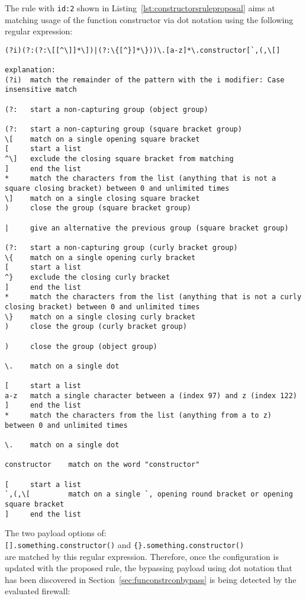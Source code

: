 The rule with \verb|id:2| shown in Listing~\ref{lst:constructorsruleproposal} aims at matching usage of the function constructor via dot notation using the following regular expression:

\begin{lstlisting}[style=basicStyle, caption=regex of proposed rule id:2, label={lst:constructorsruleproposalregexA}]
(?i)(?:(?:\[[^\]]*\])|(?:\{[^}]*\}))\.[a-z]*\.constructor[`,(,\[]

explanation:
(?i)  match the remainder of the pattern with the i modifier: Case insensitive match

(?:   start a non-capturing group (object group)

(?:   start a non-capturing group (square bracket group)
\[    match on a single opening square bracket
[     start a list
^\]   exclude the closing square bracket from matching
]     end the list
*     match the characters from the list (anything that is not a square closing bracket) between 0 and unlimited times
\]    match on a single closing square bracket
)     close the group (square bracket group)

|     give an alternative the previous group (square bracket group)

(?:	  start a non-capturing group (curly bracket group)
\{	  match on a single opening curly bracket
[     start a list
^}	  exclude the closing curly bracket
]     end the list
*     match the characters from the list (anything that is not a curly closing bracket) between 0 and unlimited times
\}	  match on a single closing curly bracket
)     close the group (curly bracket group)

)     close the group (object group)

\.    match on a single dot

[     start a list
a-z   match a single character between a (index 97) and z (index 122)
]     end the list
*     match the characters from the list (anything from a to z) between 0 and unlimited times

\.	  match on a single dot

constructor    match on the word "constructor"

[     start a list
`,(,\[         match on a single `, opening round bracket or opening square bracket
]     end the list
\end{lstlisting}

The two payload options of: \\
\verb|[].something.constructor()| and \verb|{}.something.constructor()| \\
are matched by this regular expression. Therefore, once the configuration is updated with the proposed rule, the bypassing payload using dot notation that has been discovered in Section~\ref{sec:funconstrconbypass} is being detected by the evaluated firewall:

